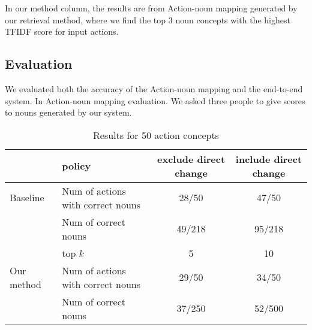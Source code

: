 In our method column, the results are from Action-noun mapping generated by
our retrieval method, where we find the top 3 noun concepts with the highest
TFIDF score for input actions. 
\subsection{Evaluation}
We evaluated both the accuracy of the Action-noun mapping and the end-to-end system.
In Action-noun mapping evaluation. We asked three people to give scores to nouns generated
by our system. 

\begin{table*}[ht]
    \caption{Results for 50 action concepts}
\small
\centering
    \begin{tabular} {l|l|c|c}
    \hline
    & policy & exclude direct change  & include direct change\\
    \hline \hline
   Baseline & Num of actions with correct nouns & 28/50 & 47/50 \\
    \cline{2-4}
    & Num of correct nouns & 49/218 & 95/218 \\
        \hline
        & top $k$ & 5 & 10 \\
    \hline
   Our method & Num of actions with correct nouns & 29/50 & 34/50 \\
    \cline{2-4}
    & Num of correct nouns & 37/250 & 52/500 \\
    \hline

\end{tabular}
\end{table*}



